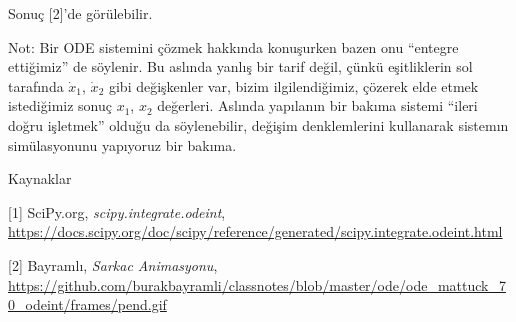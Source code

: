 \documentclass[12pt,fleqn]{article}\usepackage{../../common}
\begin{document}
Sonuç [2]'de görülebilir.

Not: Bir ODE sistemini çözmek hakkında konuşurken bazen onu ``entegre
ettiğimiz'' de söylenir. Bu aslında yanlış bir tarif değil, çünkü
eşitliklerin sol tarafında $\dot{x}_1$, $\dot{x}_2$ gibi değişkenler var,
bizim ilgilendiğimiz, çözerek elde etmek istediğimiz sonuç $x_1$, $x_2$
değerleri. Aslında yapılanın bir bakıma sistemi ``ileri doğru işletmek''
olduğu da söylenebilir, değişim denklemlerini kullanarak sistemın
simülasyonunu yapıyoruz bir bakıma.

Kaynaklar

[1] SciPy.org, {\em scipy.integrate.odeint}, \url{https://docs.scipy.org/doc/scipy/reference/generated/scipy.integrate.odeint.html}

[2] Bayramlı, {\em Sarkac Animasyonu}, \url{https://github.com/burakbayramli/classnotes/blob/master/ode/ode_mattuck_70_odeint/frames/pend.gif}
\end{document}
